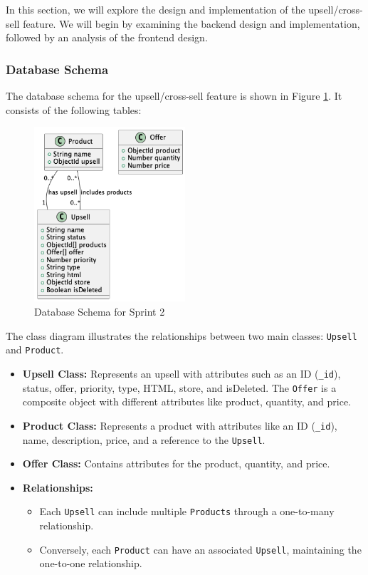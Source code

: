 In this section, we will explore the design and implementation of the upsell/cross-sell feature. We will begin by examining the backend design and implementation, followed by an analysis of the frontend design.

\subsubsection{Database Schema}

The database schema for the upsell/cross-sell feature is shown in Figure \ref{fig:db_schema_sprint2}. It consists of the following tables:

\begin{figure}[H]
    \centering
    \includegraphics[width=0.5\textwidth]{images/sprintTwoClass.png}
    \caption{Database Schema for Sprint 2}
    \label{fig:db_schema_sprint2}
\end{figure}

The class diagram illustrates the relationships between two main classes: \texttt{Upsell} and \texttt{Product}.

\begin{itemize}
    \item \textbf{Upsell Class:} Represents an upsell with attributes such as an ID (\texttt{\_id}), status, offer, priority, type, HTML, store, and isDeleted. The \texttt{Offer} is a composite object with different attributes like product, quantity, and price.
    
    \item \textbf{Product Class:} Represents a product with attributes like an ID (\texttt{\_id}), name, description, price, and a reference to the \texttt{Upsell}.
    
    \item \textbf{Offer Class:} Contains attributes for the product, quantity, and price.
    
    \item \textbf{Relationships:}
    \begin{itemize}
        \item Each \texttt{Upsell} can include multiple \texttt{Products} through a one-to-many relationship.
        \item Conversely, each \texttt{Product} can have an associated \texttt{Upsell}, maintaining the one-to-one relationship.
    \end{itemize}
\end{itemize}


